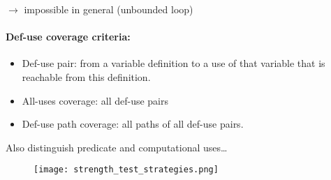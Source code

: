 $\rightarrow$ impossible in general (unbounded loop)

\paragraph{Def-use coverage criteria:}

\begin{itemize}
    \item Def-use pair: from a variable definition to a use of that variable that is reachable from this definition.
    \item All-uses coverage: all def-use pairs
    \item Def-use path coverage: all paths of all def-use pairs.
\end{itemize}

Also distinguish predicate and computational uses\ldots

\begin{figure}[!ht]
    \centering
    \texttt{[image: strength\_test\_strategies.png]}
\end{figure}
